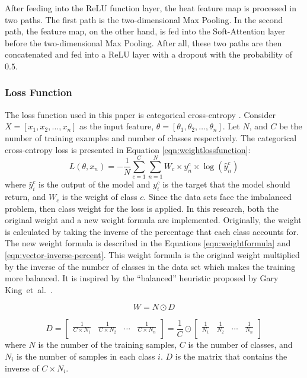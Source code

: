 \documentclass[sensors,article,accept,pdftex,moreauthors]{Definitions/mdpi}
\begin{document}
	After feeding into the ReLU function layer, the heat feature map is processed in two paths. The first path is the two-dimensional Max Pooling. In the second path, the feature map, on the other hand, is fed into the Soft-Attention layer before the two-dimensional Max Pooling. After all, these two paths are then concatenated and fed into a ReLU layer with a dropout with the probability of $0.5$.
	
	\subsubsection{Loss Function}
	The loss function used in this paper is categorical cross-entropy \hl{\mbox{\cite{8943952}}}. %
	Consider $X = [x_1, x_2, \dots, x_n]$ as the input feature, $\theta = [\theta_1, \theta_2, \dots, \theta_n]$. Let $N$, and $C$ be the number of training examples and number of classes respectively. The categorical cross-entropy loss is presented in Equation \eqref{eqn:weightlossfunction}:
	\begin{equation}
		\label{eqn:weightlossfunction}
		L(\theta, x_n) = -\frac{1}{N}\sum_{c=1}^{C}\sum_{n=1}^{N}W_c\times y^c_n \times \log(\hat{y}^c_n)
	\end{equation}
	where $\hat{y}^c_i$  is the output of the model and $y^c_i$ is the target that the model should return, and $W_c$ is the weight of class $c$. Since the data sets face the imbalanced problem, then class weight for the loss is applied. In this research, both the original weight and a new weight formula are implemented. Originally, the weight is calculated by taking the inverse of the percentage that each class accounts for. The new weight formula is described in the Equations \eqref{eqn:weightformula} and \eqref{eqn:vector-inverse-percent}. {This weight formula is the original weight multiplied by the inverse of the number of classes in the data set which makes the training more balanced. It is inspired by the “balanced” heuristic proposed by Gary King~et~al.~\mbox{\cite{WV006-01}}}.
	
	\begin{equation}
		\label{eqn:weightformula}
		W = N \odot D
	\end{equation}
	
	\begin{equation}
		\label{eqn:vector-inverse-percent}
		D = \begin{bmatrix}
\frac{1}{C \times  N_1} & \frac{1}{C \times  N_2} & \dots & \frac{1}{C \times  N_n}\\
		\end{bmatrix} = \frac{1}{C} \odot \begin{bmatrix}
\frac{1}{N_1} & \frac{1}{N_2} & \dots & \frac{1}{N_n}\\
		\end{bmatrix}
	\end{equation}
where $N$ is the number of the training samples, $C$ is the number of classes, and $N_i$ is the number of samples in each class $i$. $D$ is the matrix that contains the inverse of $C \times N_i$. 
	
\end{document}
